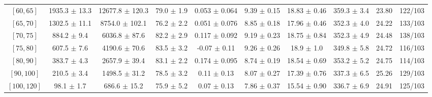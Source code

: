 \begin{tabular}{c||c|c|c|c|c|c|c||c|c}
$[60, 65]$ & 1935.3 $\pm$ 13.3 & 12677.8 $\pm$ 120.3 & 79.0 $\pm$ 1.9 & 0.053 $\pm$ 0.064 & 9.39 $\pm$ 0.15 & 18.83 $\pm$ 0.46 & 359.3 $\pm$ 3.4 & 23.80 & 122/103\\
$[65, 70]$ & 1302.5 $\pm$ 11.1 & 8754.0 $\pm$ 102.1 & 76.2 $\pm$ 2.2 & 0.051 $\pm$ 0.076 & 8.85 $\pm$ 0.18 & 17.96 $\pm$ 0.46 & 352.3 $\pm$ 4.0 & 24.22 & 133/103\\
$[70, 75]$ & 884.2 $\pm$ 9.4 & 6036.8 $\pm$ 87.6 & 82.2 $\pm$ 2.9 & 0.117 $\pm$ 0.092 & 9.19 $\pm$ 0.23 & 18.75 $\pm$ 0.84 & 352.3 $\pm$ 4.9 & 24.48 & 138/103\\
$[75, 80]$ & 607.5 $\pm$ 7.6 & 4190.6 $\pm$ 70.6 & 83.5 $\pm$ 3.2 & -0.07 $\pm$ 0.11 & 9.26 $\pm$ 0.26 & 18.9 $\pm$ 1.0 & 349.8 $\pm$ 5.8 & 24.72 & 116/103\\
$[80, 90]$ & 383.7 $\pm$ 4.3 & 2657.9 $\pm$ 39.4 & 83.1 $\pm$ 2.2 & 0.174 $\pm$ 0.095 & 8.74 $\pm$ 0.19 & 18.54 $\pm$ 0.69 & 353.2 $\pm$ 5.2 & 24.75 & 114/103\\
$[90, 100]$ & 210.5 $\pm$ 3.4 & 1498.5 $\pm$ 31.2 & 78.5 $\pm$ 3.2 & 0.11 $\pm$ 0.13 & 8.07 $\pm$ 0.27 & 17.39 $\pm$ 0.76 & 337.3 $\pm$ 6.5 & 25.26 & 129/103\\
$[100, 120]$ & 98.1 $\pm$ 1.7 & 686.6 $\pm$ 15.2 & 75.9 $\pm$ 5.2 & 0.07 $\pm$ 0.13 & 7.86 $\pm$ 0.37 & 15.54 $\pm$ 0.90 & 336.7 $\pm$ 6.9 & 24.91 & 125/103\\
\end{tabular}
